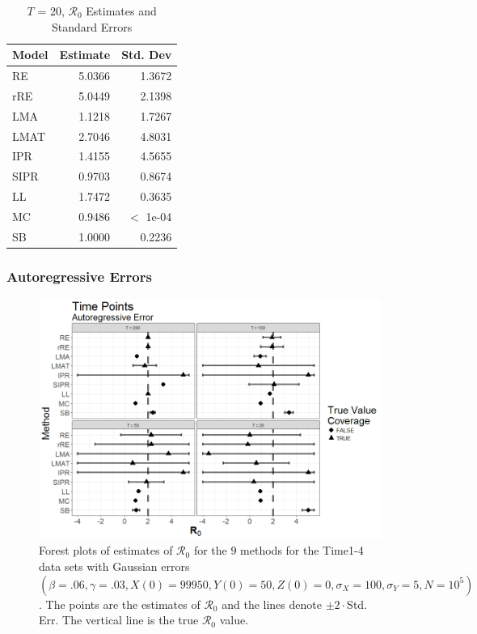\documentclass[12pt]{article}
\newcommand{\xxsir}{\ensuremath{9} } %
\newcommand{\rr}{\ensuremath{\mathcal{R}_0}}
\begin{document}
\begin{table}[H]
	\centering
	\begin{tabular}[t]{l|r|r}
		\hline
		Model & Estimate & Std. Dev\\
		\hline
		RE & 5.0366 & 1.3672\\
		\hline
		rRE & 5.0449 & 2.1398\\
		\hline
		LMA & 1.1218 & 1.7267\\
		\hline
		LMAT & 2.7046 & 4.8031\\
		\hline
		IPR & 1.4155 & 4.5655\\
		\hline
		SIPR & 0.9703 & 0.8674\\
		\hline
		LL & 1.7472 & 0.3635\\
		\hline
		MC & 0.9486 & $<$ 1e-04\\
		\hline
		SB & 1.0000 & 0.2236\\
		\hline
	\end{tabular}
	\caption{$T$ = 20, $\rr$ Estimates and Standard Errors}
\end{table}

\subsubsection{Autoregressive Errors}
\begin{figure}[H]
	\centering
	\includegraphics[scale=0.5]{images/time_ar.jpeg}
	\caption{Forest plots of estimates of $\rr$ for the \xxsir methods for the Time1-4 data sets with Gaussian errors $(\beta=.06, \gamma=.03, X(0)=99950, Y(0)=50, Z(0)=0, \sigma_X=100, \sigma_Y=5, N=10^5)$.  The points are the estimates of $\rr$ and the lines denote $\pm 2\cdot $Std. Err.  The vertical line is the true $\rr$ value.}
\end{figure}
\end{document}

